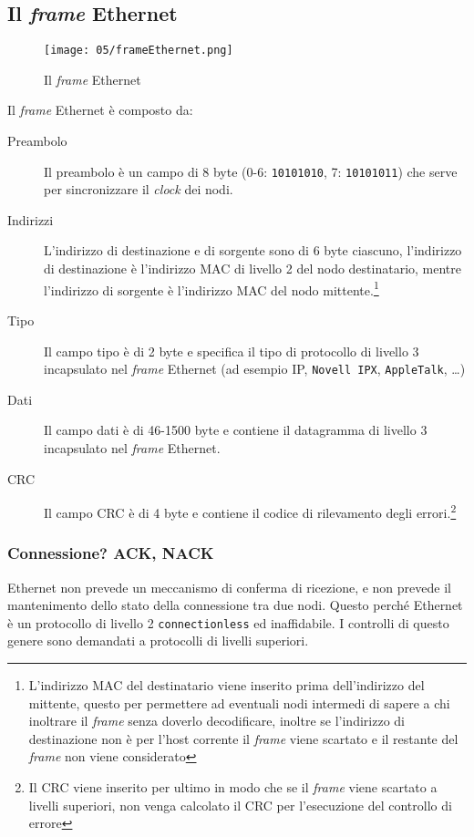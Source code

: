         \subsection{Il \textit{frame} Ethernet} 
            \begin{figure}[H]
                \centering
                \texttt{[image: 05/frameEthernet.png]}
                \caption{Il \textit{frame} Ethernet}
            \end{figure}
            Il \textit{frame} Ethernet è composto da:
            \begin{description}
                \item[Preambolo] Il preambolo è un campo di 8 byte (0-6: \texttt{10101010}, 7: \texttt{10101011}) che serve per sincronizzare il \textit{clock} dei nodi.
                \item[Indirizzi] L'indirizzo di destinazione e di sorgente sono di 6 byte ciascuno, l'indirizzo di destinazione è l'indirizzo \Acrshort*{MAC} di livello 2 del nodo destinatario, mentre l'indirizzo di sorgente è l'indirizzo \Acrshort*{MAC} del nodo mittente.\footnote{L'indirizzo \Acrshort*{MAC} del destinatario viene inserito prima dell'indirizzo del mittente, questo per permettere ad eventuali nodi intermedi di sapere a chi inoltrare il \textit{frame} senza doverlo decodificare, inoltre se l'indirizzo di destinazione non è per l'host corrente il \textit{frame} viene scartato e il restante del \textit{frame} non viene considerato}
                \item[Tipo] Il campo tipo è di 2 byte e specifica il tipo di protocollo di livello 3 incapsulato nel \textit{frame} Ethernet (ad esempio \Acrshort*{IP}, \texttt{Novell IPX}, \texttt{AppleTalk}, \dots)
                \item[Dati] Il campo dati è di 46-1500 byte e contiene il datagramma di livello 3 incapsulato nel \textit{frame} Ethernet.
                \item[\Acrshort*{CRC}] Il campo \Acrshort*{CRC} è di 4 byte e contiene il codice di rilevamento degli errori.\footnote{Il \Acrshort*{CRC} viene inserito per ultimo in modo che se il \textit{frame} viene scartato a livelli superiori, non venga calcolato il \Acrshort*{CRC} per l'esecuzione del controllo di errore} 
            \end{description}
        \subsubsection{Connessione? \Acrshort*{ACK}, \Acrshort*{NACK}} Ethernet non prevede un meccanismo di conferma di ricezione, e non prevede il mantenimento dello stato della connessione tra due nodi. Questo perché Ethernet è un protocollo di livello 2 \texttt{connectionless} ed inaffidabile. I controlli di questo genere sono demandati a protocolli di livelli superiori.
